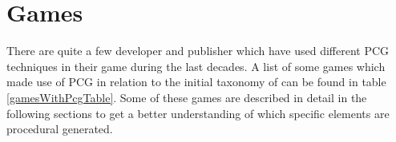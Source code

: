 \documentclass[MGS,Master,english]{twbook}%
\begin{document}
\section{Games}
There are quite a few developer and publisher which have used different PCG techniques in their game during the last decades. A list of some games which made use of PCG in relation to the initial taxonomy of \cite{pcg::survey} can be found in table \ref{gamesWithPcgTable}. Some of these games are described in detail in the following sections to get a better understanding of which specific elements are procedural generated.
\begin{table}[!htbp]
	\centering
	\caption{Some games which used PCG \protect\cite{pcg::shortHistoryOfDynamicAndPCG}}
	\label{gamesWithPcgTable}
\end{table}

\end{document}
